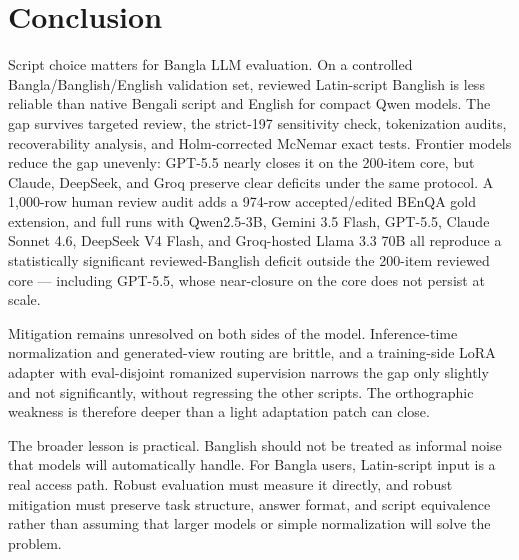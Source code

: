 \chapter{Conclusion}

Script choice matters for Bangla LLM evaluation. On a controlled Bangla/Banglish/English validation set, reviewed Latin-script Banglish is less reliable than native Bengali script and English for compact Qwen models. The gap survives targeted review, the strict-197 sensitivity check, tokenization audits, recoverability analysis, and Holm-corrected McNemar exact tests. Frontier models reduce the gap unevenly: GPT-5.5 nearly closes it on the 200-item core, but Claude, DeepSeek, and Groq preserve clear deficits under the same protocol. A 1,000-row human review audit adds a 974-row accepted/edited BEnQA gold extension, and full runs with Qwen2.5-3B, Gemini 3.5 Flash, GPT-5.5, Claude Sonnet 4.6, DeepSeek V4 Flash, and Groq-hosted Llama 3.3 70B all reproduce a statistically significant reviewed-Banglish deficit outside the 200-item reviewed core --- including GPT-5.5, whose near-closure on the core does not persist at scale.

Mitigation remains unresolved on both sides of the model. Inference-time normalization and generated-view routing are brittle, and a training-side LoRA adapter with eval-disjoint romanized supervision narrows the gap only slightly and not significantly, without regressing the other scripts. The orthographic weakness is therefore deeper than a light adaptation patch can close.

The broader lesson is practical. Banglish should not be treated as informal noise that models will automatically handle. For Bangla users, Latin-script input is a real access path. Robust evaluation must measure it directly, and robust mitigation must preserve task structure, answer format, and script equivalence rather than assuming that larger models or simple normalization will solve the problem.

\endinput

